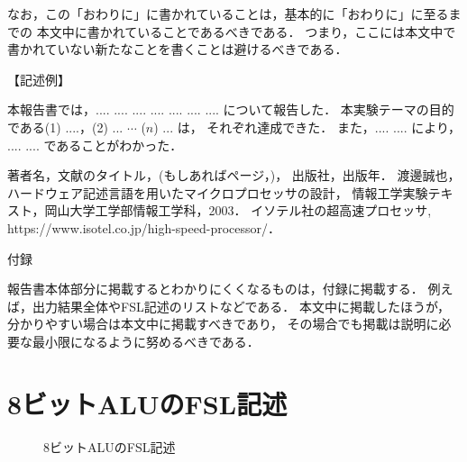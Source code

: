 \documentclass{jarticle}[11pt]
\begin{document}
    なお，この「おわりに」に書かれていることは，基本的に「おわりに」に至るまでの
    本文中に書かれていることであるべきである．
    つまり，ここには本文中で書かれていない新たなことを書くことは避けるべきである．
     
    \noindent
    【記述例】
     
    本報告書では，.... .... .... .... .... .... .... について報告した．
    本実験テーマの目的である(1) ....，(2) ... $\cdots$ ($n$) ... は，
    それぞれ達成できた．
    また，.... .... により， .... .... であることがわかった．
     
    \begin{thebibliography}{9}
     著者名，文献のタイトル，(もしあればページ，)，
    出版社，出版年．
    渡邊誠也，ハードウェア記述言語を用いたマイクロプロセッサの設計，
    情報工学実験テキスト，岡山大学工学部情報工学科，2003．
    イソテル社の超高速プロセッサ, https://www.isotel.co.jp/high-speed-processor/．
    \end{thebibliography}
     
     
    \newpage
    \appendix
     
    \noindent
    {\Large \gt 付録}
     
    報告書本体部分に掲載するとわかりにくくなるものは，付録に掲載する．
    例えば，出力結果全体やFSL記述のリストなどである．
    本文中に掲載したほうが，分かりやすい場合は本文中に掲載すべきであり，
    その場合でも掲載は説明に必要な最小限になるように努めるべきである．
     
    \section{8ビットALUのFSL記述}
    \label{appsec:8ビットALUのFSL記述}
     
    \begin{figure}[hbtp]
    \begin{center}
    
    \caption{8ビットALUのFSL記述}
    \label{fig:8ビットALUのFSL記述}
    \end{center}
    \end{figure}
     
\end{document}
